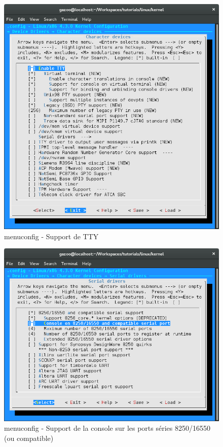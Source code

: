 \documentclass[a4paper]{article}
\begin{document}
\begin{figure}
\label{menuconfig_enable_tty}
\includegraphics[scale=0.5]{menuconfig-enable-tty.png}
\caption{menuconfig - Support de TTY}
\end{figure}

\begin{figure}
\label{menuconfig_enable_console}
\includegraphics[scale=0.5]{menuconfig-enable-console-on-8250-16550-serial-port.png}
\caption{menuconfig - Support de la console sur les ports séries 8250/16550 (ou compatible)}
\end{figure}
\end{document}

